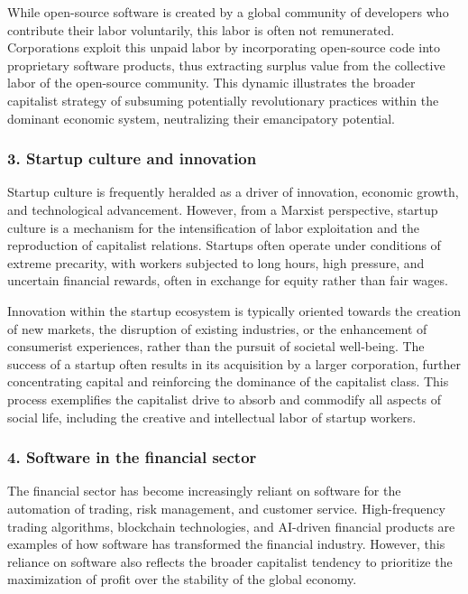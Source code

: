 \begin{refsection}
\begin{multicols}{2}
{While open-source software is created by a global community of developers who contribute their labor voluntarily, this labor is often not remunerated. Corporations exploit this unpaid labor by incorporating open-source code into proprietary software products, thus extracting surplus value from the collective labor of the open-source community. This dynamic illustrates the broader capitalist strategy of subsuming potentially revolutionary practices within the dominant economic system, neutralizing their emancipatory potential.

\subsubsection*{3. Startup culture and innovation}

Startup culture is frequently heralded as a driver of innovation, economic growth, and technological advancement. However, from a Marxist perspective, startup culture is a mechanism for the intensification of labor exploitation and the reproduction of capitalist relations. Startups often operate under conditions of extreme precarity, with workers subjected to long hours, high pressure, and uncertain financial rewards, often in exchange for equity rather than fair wages.

Innovation within the startup ecosystem is typically oriented towards the creation of new markets, the disruption of existing industries, or the enhancement of consumerist experiences, rather than the pursuit of societal well-being. The success of a startup often results in its acquisition by a larger corporation, further concentrating capital and reinforcing the dominance of the capitalist class. This process exemplifies the capitalist drive to absorb and commodify all aspects of social life, including the creative and intellectual labor of startup workers.

\subsubsection*{4. Software in the financial sector}

The financial sector has become increasingly reliant on software for the automation of trading, risk management, and customer service. High-frequency trading algorithms, blockchain technologies, and AI-driven financial products are examples of how software has transformed the financial industry. However, this reliance on software also reflects the broader capitalist tendency to prioritize the maximization of profit over the stability of the global economy.

}
\end{multicols}
\end{refsection}
